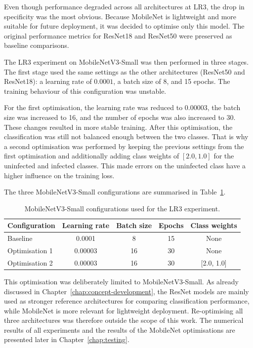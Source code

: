 Even though performance degraded across all architectures at LR3, the drop in specificity was the most obvious. Because MobileNet is lightweight and more suitable for future deployment, it was decided to optimise only this model. The original performance metrics for ResNet18 and ResNet50 were preserved as baseline comparisons.

The LR3 experiment on MobileNetV3-Small was then performed in three stages. The first stage used the same settings as the other architectures (ResNet50 and ResNet18): a learning rate of \(0.0001\), a batch size of 8, and 15 epochs. The training behaviour of this configuration was unstable.

For the first optimisation, the learning rate was reduced to \(0.00003\), the batch size was increased to 16, and the number of epochs was also increased to 30. These changes resulted in more stable training. After this optimisation, the classification was still not balanced enough between the two classes. That is why a second optimisation was performed by keeping the previous settings from the first optimisation and additionally adding class weights of \([2.0, 1.0]\) for the uninfected and infected classes. This made errors on the uninfected class have a higher influence on the training loss.

The three MobileNetV3-Small configurations are summarised in Table~\ref{tab:mobilenet_optimisation}.

\begin{table}[htbp]
    \centering
    \caption{MobileNetV3-Small configurations used for the LR3 experiment.}
    \label{tab:mobilenet_optimisation}
    \begin{tabular}{|l|c|c|c|c|}
        \hline
        \textbf{Configuration} & \textbf{Learning rate} & \textbf{Batch size} & \textbf{Epochs} & \textbf{Class weights} \\ \hline
        Baseline & 0.0001 & 8 & 15 & None \\ \hline
        Optimisation 1 & 0.00003 & 16 & 30 & None \\ \hline
        Optimisation 2 & 0.00003 & 16 & 30 & [2.0, 1.0] \\ \hline
    \end{tabular}
\end{table}

\FloatBarrier

This optimisation was deliberately limited to MobileNetV3-Small. As already discussed in Chapter~\ref{chap:concept-development}, the ResNet models are mainly used as stronger reference architectures for comparing classification performance, while MobileNet is more relevant for lightweight deployment. Re-optimising all three architectures was therefore outside the scope of this work. The numerical results of all experiments and the results of the MobileNet optimisations are presented later in Chapter~\ref{chap:testing}.

